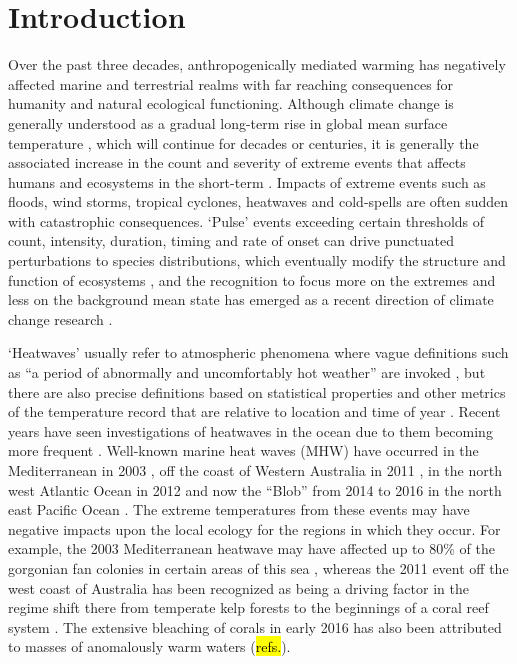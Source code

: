 \documentclass[a4paper,10pt,review]{elsarticle}
\begin{document}
\linenumbers

\section{Introduction}

Over the past three decades, anthropogenically mediated warming has negatively affected marine and terrestrial realms with far reaching consequences for humanity and natural ecological functioning. Although climate change is generally understood as a gradual long-term rise in global mean surface temperature \citep{IPCC2014}, which will continue for decades or centuries, it is generally the associated increase in the count and severity of extreme events that affects humans and ecosystems in the short-term \citep{Easterling2000}. Impacts of extreme events such as floods, wind storms, tropical cyclones, heatwaves and cold-spells are often sudden with catastrophic consequences. `Pulse' events exceeding certain thresholds of count, intensity, duration, timing and rate of onset can drive punctuated perturbations to species distributions, which eventually modify the structure and function of ecosystems \citep{Wernberg2013, Rehage2016}, and the recognition to focus more on the extremes and less on the background mean state has emerged as a recent direction of climate change research \citep{Jentsch2007}.

`Heatwaves' usually refer to atmospheric phenomena where vague definitions such as ``a period of abnormally and uncomfortably hot weather'' are invoked \citep{Glickman2000}, but there are also precise definitions based on statistical properties and other metrics of the temperature record that are relative to location and time of year \citep[e.g.][]{Meehl2004, Alexander2006, Fischer2010, Fischer2011, Perkins2013}. Recent years have seen investigations of heatwaves in the ocean due to them becoming more frequent \citep[e.g.][]{Mackenzie2007, Selig2010, Sura2011, Lima2012, DeCastro2014}. Well-known marine heat waves (MHW) have occurred in the Mediterranean in 2003 \citep{Black2004, Olita2007, Garrabou2009}, off the coast of Western Australia in 2011 \citep{Feng2013, Pearce2013, Wernberg2013}, in the north west Atlantic Ocean in 2012 \citep{Mills2012, Chen2014, Chen2015} and now the ``Blob'' from 2014 to 2016 in the north east Pacific Ocean \citep{Bond2015}. The extreme temperatures from these events may have negative impacts upon the local ecology for the regions in which they occur. For example, the 2003 Mediterranean heatwave may have affected up to 80\% of the gorgonian fan colonies in certain areas of this sea \citep{Garrabou2009}, whereas the 2011 event off the west coast of Australia has been recognized as being a driving factor in the regime shift there from temperate kelp forests to the beginnings of a coral reef system \citep{Wernberg2013}. The extensive bleaching of corals in early 2016 has also been attributed to masses of anomalously warm waters (\hl{refs.}).
\end{document}
